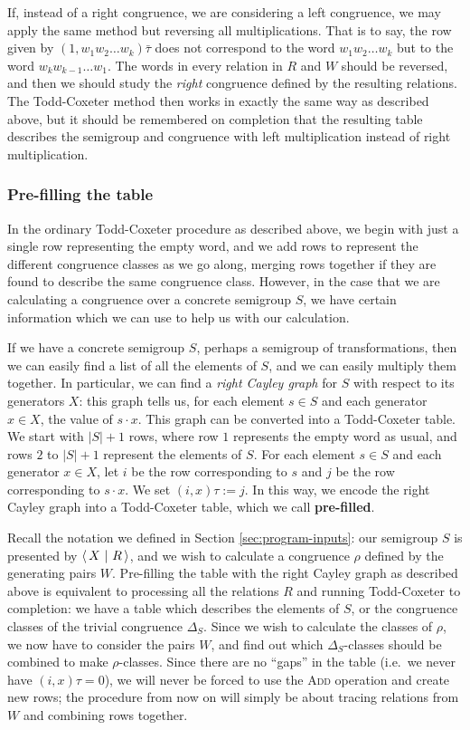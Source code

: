 If, instead of a right congruence, we are considering a left congruence, we may
apply the same method but reversing all multiplications.  That is to say, the
row given by $(1, w_1 w_2 \ldots w_k)\bar\tau$ does not correspond to the word
$w_1 w_2 \ldots w_k$ but to the word $w_k w_{k-1} \ldots w_1$.  The words in
every relation in $R$ and $W$ should be reversed, and then we should study the
\textit{right} congruence defined by the resulting relations.  The Todd-Coxeter method
then works in exactly the same way as described above, but it should be
remembered on completion that the resulting table describes the semigroup and
congruence with left multiplication instead of right multiplication.

\subsubsection{Pre-filling the table}
\label{sec:tc-prefill}
In the ordinary Todd-Coxeter procedure as described above, we begin with just a
single row representing the empty word, and we add rows to represent the
different congruence classes as we go along, merging rows together if they are
found to describe the same congruence class.  However, in the case that we are
calculating a congruence over a concrete semigroup $S$, we have certain
information which we can use to help us with our calculation.

If we have a concrete semigroup $S$, perhaps a semigroup of transformations,
then we can easily find a list of all the elements of $S$, and we can easily
multiply them together.  In particular, we can find a \textit{right Cayley
  graph} for $S$ with respect to its generators $X$: this graph tells us, for
each element $s \in S$ and each generator $x \in X$, the value of $s \cdot x$.
This graph can be converted into a Todd-Coxeter table.  We start with $|S| + 1$
rows, where row $1$ represents the empty word as usual, and rows $2$ to $|S| + 1$
represent the elements of $S$.  For each element $s \in S$ and each generator
$x \in X$, let $i$ be the row corresponding to $s$ and $j$ be the row
corresponding to $s \cdot x$.  We set $(i, x)\tau := j$.  In this way, we encode
the right Cayley graph into a Todd-Coxeter table, which we call
\textbf{pre-filled}.

Recall the notation we defined in Section \ref{sec:program-inputs}: our
semigroup $S$ is presented by $\left\langle\,X ~\middle|~ R\,\right\rangle$, and we wish to calculate a congruence
$\rho$ defined by the generating pairs $W$.  Pre-filling the table with the
right Cayley graph as described above is equivalent to processing all the
relations $R$ and running Todd-Coxeter to completion: we have a table which
describes the elements of $S$, or the congruence classes of the trivial
congruence $\Delta_S$.  Since we wish to calculate the classes of $\rho$, we now
have to consider the pairs $W$, and find out which $\Delta_S$-classes should be
combined to make $\rho$-classes.  Since there are no ``gaps'' in the table (i.e.~we never have
$(i,x)\tau=0$), we will never be forced to use the \textsc{Add} operation and
create new rows; the procedure from now on will simply be about tracing
relations from $W$ and combining rows together.

